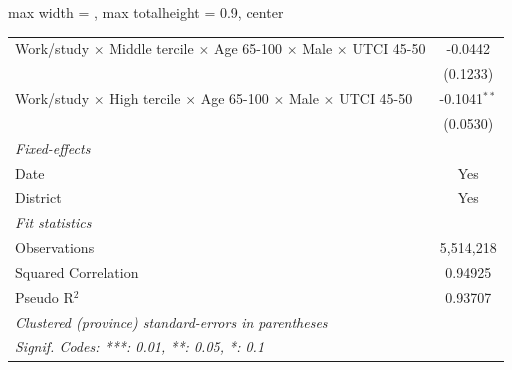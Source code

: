 \begin{table}[htbp]
\begin{adjustbox}{max width = \textwidth, max totalheight = 0.9\textheight, center}
\begin{tabular}{lc}
         Work/study $\times$ Middle tercile $\times$ Age 65-100 $\times$ Male $\times$ UTCI 45-50       & -0.0442\\   
                                                                                                        & (0.1233)\\   
         Work/study $\times$ High tercile $\times$ Age 65-100 $\times$ Male $\times$ UTCI 45-50         & -0.1041$^{**}$\\   
                                                                                                        & (0.0530)\\   
         \midrule
         \emph{Fixed-effects}\\
         Date                                                                                           & Yes\\  
         District                                                                                       & Yes\\  
         \midrule
         \emph{Fit statistics}\\
         Observations                                                                                   & 5,514,218\\  
         Squared Correlation                                                                            & 0.94925\\  
         Pseudo R$^2$                                                                                   & 0.93707\\  
         \midrule \midrule
         \multicolumn{2}{l}{\emph{Clustered (province) standard-errors in parentheses}}\\
         \multicolumn{2}{l}{\emph{Signif. Codes: ***: 0.01, **: 0.05, *: 0.1}}\\
      \end{tabular}
   \end{adjustbox}
\end{table}


